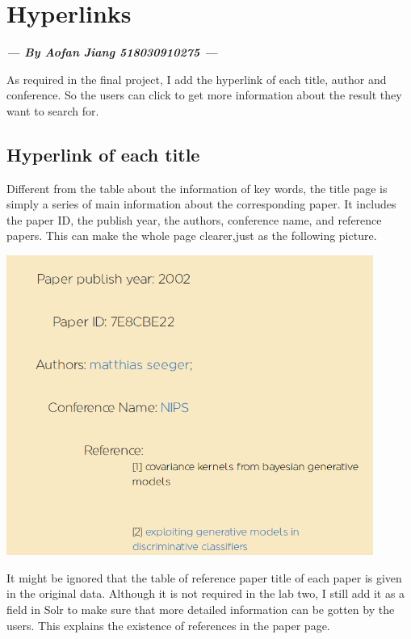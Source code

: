 \documentclass[10pt,twoside,a4paper,titlepage]{article}
\begin{document}
\newpage


\section{Hyperlinks}
\textbf{\emph{--- By Aofan Jiang 518030910275 ---}}\newline\par
As required in the final project, I add the hyperlink of each title, author and conference. So the users can click to get more information about the result they want to search for.
\subsection{Hyperlink of each title}
Different from the table about the information of key words, the title page is simply a series of main information about the corresponding paper. It includes the paper ID, the publish year, the authors, conference name, and reference papers. This can make the whole page clearer,just as the following picture.\newline\par
\includegraphics[width=0.9\textwidth]{jaf/titleexample.PNG}\newline\par
 It might be ignored that the table of reference paper title of each paper is given in the original data. Although it is not required in the lab two, I still add it as a field in Solr to make sure that more detailed information can be gotten by the users. This explains the existence of references in the paper page.\newline\par
\end{document}
